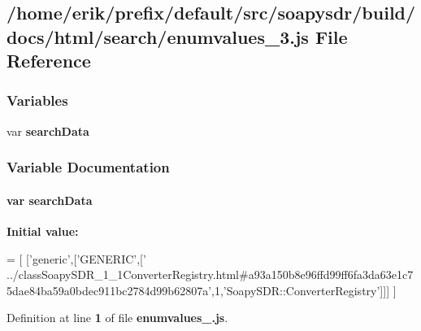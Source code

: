 \subsection{/home/erik/prefix/default/src/soapysdr/build/docs/html/search/enumvalues\+\_\+3.js File Reference}
\label{enumvalues__3_8js}
\subsubsection*{Variables}
\begin{DoxyCompactItemize}
\item 
var {\bf search\+Data}
\end{DoxyCompactItemize}


\subsubsection{Variable Documentation}
\paragraph[{search\+Data}]{\setlength{\rightskip}{0pt plus 5cm}var search\+Data}\label{enumvalues__3_8js_ad01a7523f103d6242ef9b0451861231e}
{\bfseries Initial value\+:}
\begin{DoxyCode}
=
[
  [\textcolor{stringliteral}{'generic'},[\textcolor{stringliteral}{'GENERIC'},[\textcolor{stringliteral}{'
      ../classSoapySDR\_1\_1ConverterRegistry.html#a93a150b8e96ffd99ff6fa3da63e1c75dae84ba59a0bdec911bc2784d99b62807a'},1,\textcolor{stringliteral}{'SoapySDR::ConverterRegistry'}]]]
]
\end{DoxyCode}


Definition at line {\bf 1} of file {\bf enumvalues\+\_.\+js}.

